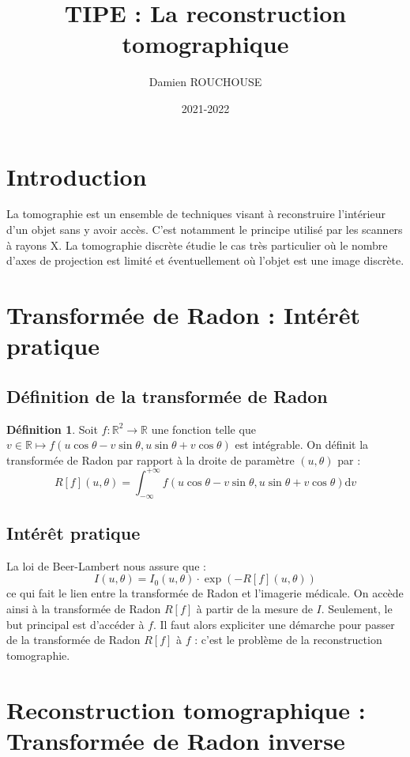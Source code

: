 \documentclass{article}
\title{TIPE : La reconstruction tomographique}
\author{Damien ROUCHOUSE}
\date{2021-2022}
\newcommand*{\R}{\mathbb{R}}
\newcommand*{\dd}[1]{\mathrm{d}#1}
\theoremstyle{definition}
\newtheorem{definition}{Définition}
\theoremstyle{remark}
\theoremstyle{plain}
\theoremstyle{definition}
\begin{document}
\maketitle

\section*{Introduction}
La tomographie est un ensemble de techniques visant à reconstruire l’intérieur d’un objet sans y avoir accès. 
C'est notamment le principe utilisé par les scanners à rayons X. La tomographie discrète étudie le cas très particulier 
où le nombre d’axes de projection est limité et éventuellement où l'objet est une image discrète.

\section{Transformée de Radon : Intérêt pratique}
\subsection{Définition de la transformée de Radon}
\begin{definition}
    Soit $f : \R^2 \longrightarrow \R$ une fonction telle que $v \in \R \mapsto f(u \cos{\theta} - v \sin{\theta}, u \sin{\theta} + v \cos{\theta})$ est intégrable. 
    On définit la transformée de Radon par rapport à la droite de paramètre $(u, \theta)$ par : 
    $$R[f](u,\theta) = \int_{-\infty}^{+\infty} f(u \cos{\theta} - v \sin{\theta}, u \sin{\theta} + v \cos{\theta}) \dd v $$
\end{definition}

\subsection{Intérêt pratique}
\noindent La loi de Beer-Lambert nous assure que : 
$$I(u,\theta) = I_0(u,\theta) \cdot \exp\left(-R[f](u,\theta)\right)$$
ce qui fait le lien entre la transformée de Radon et l'imagerie médicale. 
\noindent On accède ainsi à la transformée de Radon $R[f]$ à partir de la mesure de $I$. Seulement, le but principal est d'accéder à $f$. Il faut alors expliciter une démarche pour 
passer de la transformée de Radon $R[f]$ à $f$ : c'est le problème de la reconstruction tomographie.

\section{Reconstruction tomographique : Transformée de Radon inverse}
\end{document}

